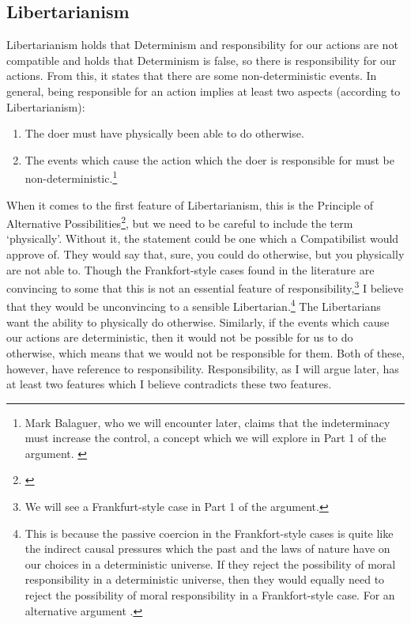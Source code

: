 \subsection{Libertarianism}
Libertarianism holds that Determinism and responsibility for our actions are not compatible and holds that Determinism is false, so there is responsibility for our actions. From this, it states that there are some non-deterministic events. In general, being responsible for an action implies at least two aspects (according to Libertarianism):
\begin{enumerate}
\item The doer must have physically been able to do otherwise.
\item The events which cause the action which the doer is responsible for must be non-deterministic.\footnote{Mark Balaguer, who we will encounter later, claims that the indeterminacy must increase the control, a concept which we will explore in Part 1 of the argument. \cite{Balaguer2}} 
\end{enumerate}
When it comes to the first feature of Libertarianism, this is the Principle of Alternative Possibilities\footnote{\cite[As presented in][ ]{Frankfurt1}}, but we need to be careful to include the term ‘physically'. Without it, the statement could be one which a Compatibilist would approve of. They would say that, sure, you could do otherwise, but you physically are not able to. Though the Frankfort-style cases found in the literature are convincing to some that this is not an essential feature of responsibility,\footnote{We will see a Frankfurt-style case in Part 1 of the argument.}  I believe that they would be unconvincing to a sensible Libertarian.\footnote{This is because the passive coercion in the Frankfort-style cases is quite like the indirect causal pressures which the past and the laws of nature have on our choices in a deterministic universe. If they reject the possibility of moral responsibility in a deterministic universe, then they would equally need to reject the possibility of moral responsibility in a Frankfort-style case. For an alternative argument \cite[see][ ]{Widerker1}.}  The Libertarians want the ability to physically do otherwise. Similarly, if the events which cause our actions are deterministic, then it would not be possible for us to do otherwise, which means that we would not be responsible for them. Both of these, however, have reference to responsibility. Responsibility, as I will argue later, has at least two features which I believe contradicts these two features. 

